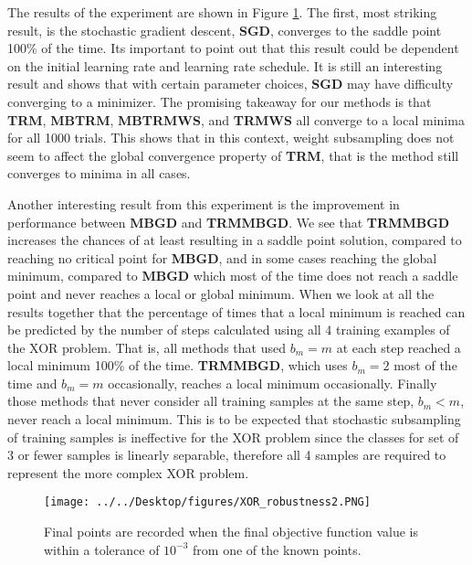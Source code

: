 \documentclass[letterpaper,12pt,titlepage,oneside,final]{book}
\begin{document}
	The results of the experiment are shown in Figure \ref{figure:XOR}. The first, most striking result, is the stochastic gradient descent, \textbf{SGD}, converges to the saddle point 100\% of the time. Its important to point out that this result could be dependent on the initial learning rate and learning rate schedule. It is still an interesting result and shows that with certain parameter choices, \textbf{SGD} may have difficulty converging to a minimizer. The promising takeaway for our methods is that \textbf{TRM}, \textbf{MBTRM}, \textbf{MBTRMWS}, and \textbf{TRMWS} all converge to a local minima for all 1000 trials. This shows that in this context, weight subsampling does not seem to affect the global convergence property of \textbf{TRM}, that is the method still converges to minima in all cases. 
	
	Another interesting result from this experiment is the improvement in performance between \textbf{MBGD} and \textbf{TRMMBGD}. We see that \textbf{TRMMBGD} increases the chances of at least resulting in a saddle point solution, compared to reaching no critical point for \textbf{MBGD}, and in some cases reaching the global minimum, compared to \textbf{MBGD} which most of the time does not reach a saddle point and never reaches a local or global minimum. When we look at all the results together that the percentage of times that a local minimum is reached can be predicted by the number of steps calculated using all 4 training examples of the XOR problem. That is, all methods that used $b_{m} = m$ at each step reached a local minimum 100\% of the time. \textbf{TRMMBGD}, which uses $b_{m} = 2$ most of the time and $b_{m} = m$ occasionally, reaches a local minimum occasionally. Finally those methods that never consider all training samples at the same step, $b_{m} < m$, never reach a local minimum. This is to be expected that stochastic subsampling of training samples is ineffective for the XOR problem since the classes for set of 3 or fewer samples is linearly separable, therefore all 4 samples are required to represent the more complex XOR problem.
	
	\begin{figure}[h]
		\centering
		\texttt{[image: ../../Desktop/figures/XOR\_robustness2.PNG]}
		\caption{Final points are recorded when the final objective function value is within a tolerance of $10^{-3}$ from one of the known points.}
		\label{figure:XOR}
	\end{figure}
\end{document}

